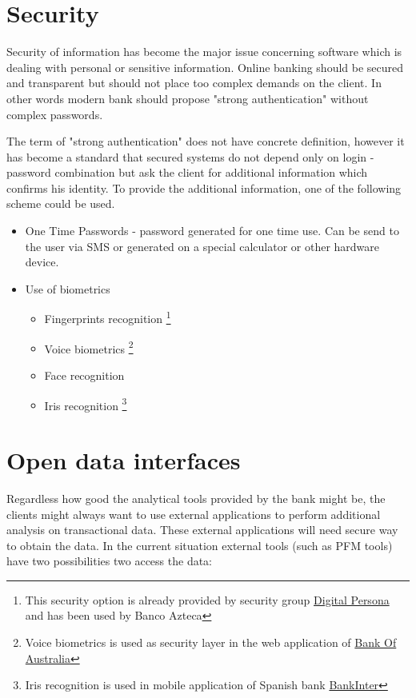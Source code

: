 \section{Security}
Security of information has become the major issue concerning software which is dealing with personal or sensitive information. Online banking should be secured and transparent but should not place too complex demands on the client. In other words modern bank should propose "strong authentication" without complex passwords.

The term of "strong authentication" does not have concrete definition, however it has become a standard that secured systems do not depend only on login - password combination but ask the client for additional information which confirms his identity. To provide the additional information, one of the following scheme could be used.

\begin{itemize}
	\item One Time Passwords - password generated for one time use. Can be send to the user via SMS or generated on a special calculator or other hardware device.
	\item Use of biometrics
	\begin{itemize}
		\item Fingerprints recognition \footnote{This security option is already provided by security group \href{http://www.digitalpersona.com/}{Digital Persona} and has been used by Banco Azteca}
		\item Voice biometrics \footnote{Voice biometrics is used as security layer in the web application of \href{http://www.itwire.com/it-industry-news/strategy/25609-national-australia-bank-replaces-pins-with-voice-biometrics}{Bank Of Australia}}
		\item Face recognition
		\item Iris recognition \footnote{Iris recognition is used in mobile application of Spanish bank \href{http://www.mobbeel.com/mobbeel-integrates-biometric-iris-recognition-in-the-mobile-brokerage-application-of-bankinter/}{BankInter}}
	\end{itemize}
\end{itemize}

\section{Open data interfaces}
Regardless how good the analytical tools provided by the bank might be, the clients might always want to use external applications to perform additional analysis on transactional data. These external applications will need secure way to obtain the data.
In the current situation external tools (such as PFM tools) have two possibilities two access the data:

